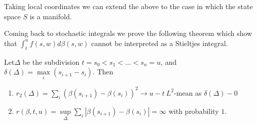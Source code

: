 Taking local coordinates we can extend the above to the case in which
the state space $S$ is a manifold. 

Coming back to stochastic integrals we prove the following theorem
which show that $\int^u_t f(s, w) d \beta (s, w)$ cannot be
interpreted as a Stieltjes integral. 

\begin{theorem*}
  Let\pageoriginale $\Delta$ be the subdivision $t = s_0 < s_1 <
  \ldots < s_n = u$, 
  and $\delta (\Delta) = \max\limits_i(s_{i+1} - s_i)$. Then  
  \begin{enumerate}
  \item $r_2 (\Delta) = \sum\limits_i (\beta(s_{i+1}) - \beta(s_i))^2
    \to u - t\ L^2$-mean as $\delta (\Delta) -0$ 

  \item $r(\beta, t, u) = \sup\limits_{\Delta} \sum\limits_i| \beta
    (s_{i+1}) - \beta (s_i)| = \infty$ with probability $1$. 
  \end{enumerate}
\end{theorem*} 

